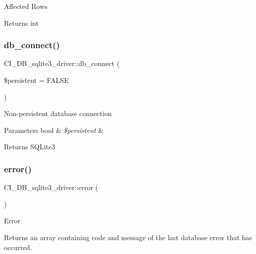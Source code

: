 Affected Rows

\begin{DoxyReturn}{Returns}
int 
\end{DoxyReturn}
\mbox{\label{class_c_i___d_b__sqlite3__driver_a0d28ddaa657330aac6829b4ae7415f2b}} 
\subsubsection{\texorpdfstring{db\+\_\+connect()}{db\_connect()}}
{\footnotesize\ttfamily C\+I\+\_\+\+D\+B\+\_\+sqlite3\+\_\+driver\+::db\+\_\+connect (\begin{DoxyParamCaption}\item[{}]{\$persistent = {\ttfamily FALSE} }\end{DoxyParamCaption})}

Non-\/persistent database connection


\begin{DoxyParams}[1]{Parameters}
bool & {\em \$persistent} & \\
\hline
\end{DoxyParams}
\begin{DoxyReturn}{Returns}
S\+Q\+Lite3 
\end{DoxyReturn}
\mbox{\label{class_c_i___d_b__sqlite3__driver_aa25971bd22dde08ce3a7ad1c4537b746}} 
\subsubsection{\texorpdfstring{error()}{error()}}
{\footnotesize\ttfamily C\+I\+\_\+\+D\+B\+\_\+sqlite3\+\_\+driver\+::error (\begin{DoxyParamCaption}{ }\end{DoxyParamCaption})}

Error

Returns an array containing code and message of the last database error that has occurred.

